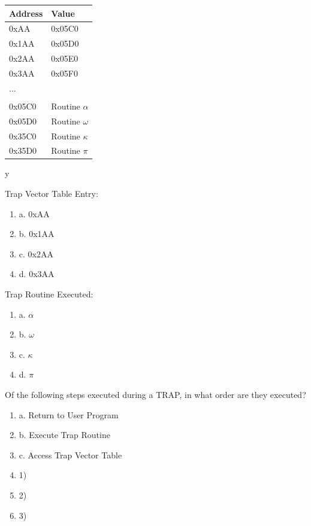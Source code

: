 \documentclass{article}
\begin{document}
\begin{enumerate}[label=(\alph*)]
\begin{center}
\begin{tabular}{|p{3cm} p{3cm} |} 
\hline
 Address & Value  \\ [0.5ex] 
 \hline\hline
 0xAA & 0x05C0 \\ 
 \hline
 0x1AA & 0x05D0 \\
 \hline
 0x2AA & 0x05E0 \\
 \hline
 0x3AA & 0x05F0 \\
 \hline
 ... &  \\ [1ex]
 \hline
  & \\ [1ex]
  \hline
  0x05C0 & Routine $\alpha$ \\
  \hline
  0x05D0 & Routine $\omega$\\
  \hline
  0x35C0 & Routine $\kappa$ \\
  \hline
  0x35D0 & Routine $\pi$ \\
 \hline
 
\end{tabular}y




\end{center}

Trap Vector Table Entry:

\begin{enumerate}[label={}]
    \item a. 0xAA
    \item b. 0x1AA
    \item c. 0x2AA
    \item d. 0x3AA

    \end{enumerate}

Trap Routine Executed:

\begin{enumerate}[label={}]
    \item a. $\alpha$ 
    \item b. $\omega$
    \item c. $\kappa$
    \item d. $\pi$
\end{enumerate}

Of the following steps executed during a TRAP, in what order are they executed?
\begin{enumerate}[label={}]
    
\item a. Return to User Program
\item b. Execute Trap Routine
\item c. Access Trap Vector Table
\newline
\item 1)
\item 2)
\item 3)

\end{enumerate}
\end{enumerate}
\end{document}
